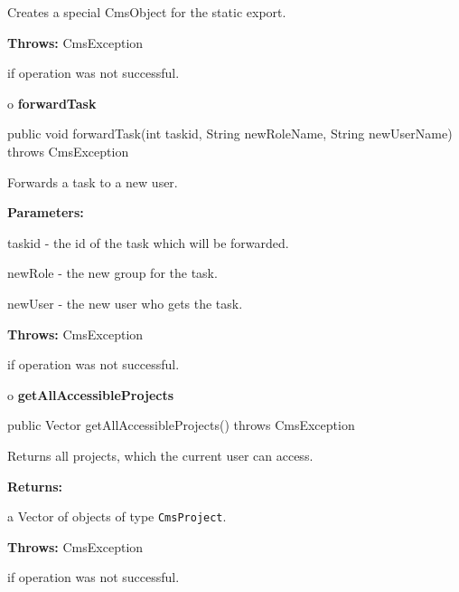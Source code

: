 \begin{description}
\htmlDD Creates a special CmsObject for the static export. 

\begin{description}
\item {\bf Throws:} CmsException  

if operation was not successful.  
\end{description}

\end{description}

o {\bf forwardTask} 

\begin{PRE}
 public void forwardTask(int taskid,
                         String newRoleName,
                         String newUserName) throws CmsException
\end{PRE}

\begin{description}
\htmlDD Forwards a task to a new user. 

\begin{description}
\item {\bf Parameters:}  

taskid - the id of the task which will be forwarded.  

newRole - the new group for the task.  

newUser - the new user who gets the task.  
\item {\bf Throws:} CmsException  

if operation was not successful.  
\end{description}

\end{description}

o {\bf getAllAccessibleProjects} 

\begin{PRE}
 public Vector getAllAccessibleProjects() throws CmsException
\end{PRE}

\begin{description}
\htmlDD Returns all projects, which the current user can access. 

\begin{description}
\item {\bf Returns:}  

a Vector of objects of type {\tt CmsProject}.  
\item {\bf Throws:} CmsException  

if operation was not successful.  
\end{description}

\end{description}

